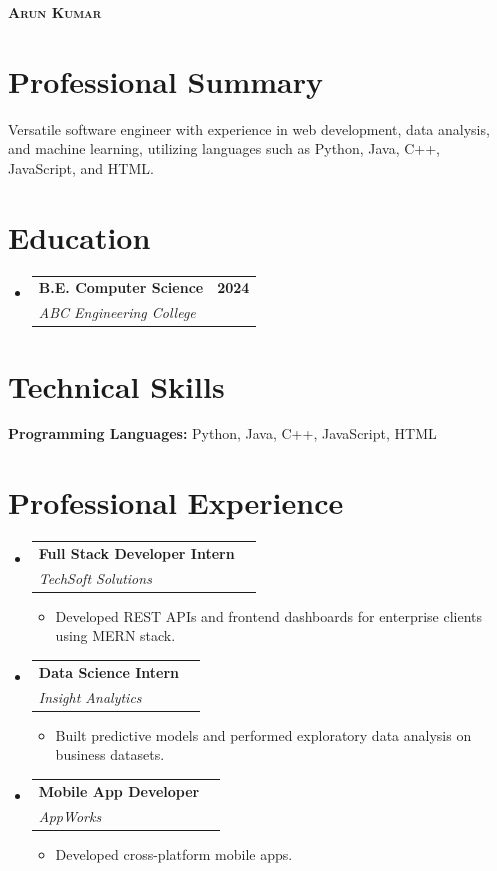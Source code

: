 \documentclass[a4paper,10pt]{article}
\makeatletter
\newcommand{\resumeItem}[1]{
  \item\small{#1 \vspace{-2pt}}
}
\newcommand{\resumeSubheading}[4]{
  \vspace{-1pt}\item
    \begin{tabular*}{0.97\textwidth}[t]{l@{\extracolsep{\fill}}r}
      \textbf{#1} & \textbf{#2} \\
      \textit{\small#3} & \textit{\small #4} \\
    \end{tabular*}\vspace{-5pt}
}
\newcommand{\resumeSubHeadingListStart}{\begin{itemize}[leftmargin=0.15in, label={}]}
\newcommand{\resumeSubHeadingListEnd}{\end{itemize}}
\newcommand{\resumeItemListStart}{\begin{itemize}[leftmargin=0.2in]}
\newcommand{\resumeItemListEnd}{\end{itemize}\vspace{-5pt}}
\makeatother
\begin{document}
\begin{minipage}[t]{0.75\textwidth}
  \begin{center}
    {\Huge\bfseries\scshape Arun Kumar} \\[8pt]
    \small 
      \end{center}
\end{minipage}%

\vspace{8pt}

\section{Professional Summary}
\small{Versatile software engineer with experience in web development, data analysis, and machine learning, utilizing languages such as Python, Java, C++, JavaScript, and HTML.}
\vspace{6pt}


\section{Education}
\resumeSubHeadingListStart
  \resumeSubheading
    {B.E. Computer Science}{2024}
    {ABC Engineering College}{}
\resumeSubHeadingListEnd
\vspace{4pt}

\section{Technical Skills}
\small{
    \textbf{Programming Languages:} Python, Java, C++, JavaScript, HTML \\
  }
\vspace{6pt}

\section{Professional Experience}
\resumeSubHeadingListStart
  \resumeSubheading
    {Full Stack Developer Intern}{}
    {TechSoft Solutions}{}
        \resumeItemListStart
            \resumeItem{Developed REST APIs and frontend dashboards for enterprise clients using MERN stack.}
          \resumeItemListEnd
          \resumeSubheading
    {Data Science Intern}{}
    {Insight Analytics}{}
        \resumeItemListStart
            \resumeItem{Built predictive models and performed exploratory data analysis on business datasets.}
          \resumeItemListEnd
          \resumeSubheading
    {Mobile App Developer}{}
    {AppWorks}{}
        \resumeItemListStart
            \resumeItem{Developed cross-platform mobile apps.}
          \resumeItemListEnd
        \resumeSubHeadingListEnd
\vspace{4pt}
\end{document}

